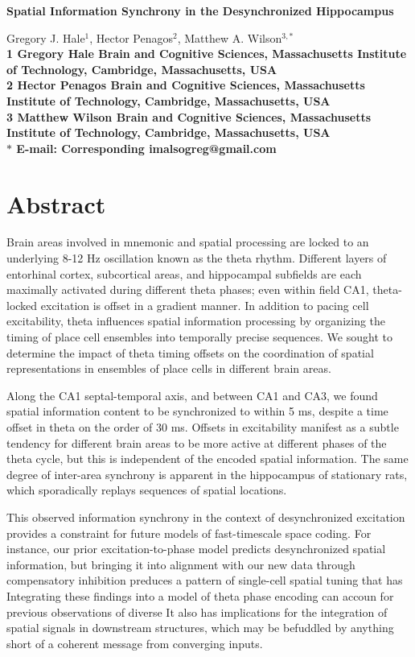 \documentclass[10pt]{article}
\date{}
\begin{document}
\begin{flushleft}
{\Large
\textbf{Spatial Information Synchrony in the Desynchronized Hippocampus}
}

Gregory J. Hale$^{1}$, 
Hector Penagos$^{2}$, 
Matthew A. Wilson$^{3,\ast}$
\\
\bf{1} Gregory Hale Brain and Cognitive Sciences, Massachusetts Institute of Technology, Cambridge, Massachusetts, USA
\\
\bf{2} Hector Penagos Brain and Cognitive Sciences, Massachusetts Institute of Technology, Cambridge, Massachusetts, USA
\\
\bf{3} Matthew Wilson Brain and Cognitive Sciences, Massachusetts Institute of Technology, Cambridge, Massachusetts, USA
\\
$\ast$ E-mail: Corresponding imalsogreg@gmail.com
\end{flushleft}

\section*{Abstract}
Brain areas involved in mnemonic and spatial processing are locked to an underlying 8-12 Hz oscillation known as the theta rhythm.  Different layers of entorhinal cortex, subcortical areas, and hippocampal subfields are each maximally activated during different theta phases; even within field CA1, theta-locked excitation is offset in a gradient manner.  In addition to pacing cell excitability, theta influences spatial information processing by organizing the timing of place cell ensembles into temporally precise sequences. We sought to determine the impact of theta timing offsets on the coordination of spatial representations in ensembles of place cells in different brain areas.

Along the CA1 septal-temporal axis, and between CA1 and CA3, we found spatial information content to be synchronized to within 5 ms, despite a time offset in theta on the order of 30 ms. Offsets in excitability manifest as a subtle tendency for different brain areas to be more active at different phases of the theta cycle, but this is independent of the encoded spatial information. The same degree of inter-area synchrony is apparent in the hippocampus of stationary rats, which sporadically replays sequences of spatial locations.

This observed information synchrony in the context of desynchronized excitation provides a constraint for future models of fast-timescale space coding. For instance, our prior excitation-to-phase model predicts desynchronized spatial information, but bringing it into alignment with our new data through compensatory inhibition preduces a pattern of single-cell spatial tuning that has 
Integrating these findings into a model of theta phase encoding can accoun for previous observations of diverse It also has implications for the integration of spatial signals in downstream structures, which may be befuddled by anything short of a coherent message from converging inputs.
\end{document}
